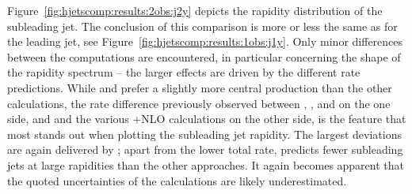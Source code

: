 Figure~\ref{fig:hjetscomp:results:2obs:j2y} depicts the rapidity
distribution of the subleading jet. The conclusion of this comparison is
more or less the same as for the leading jet, see
Figure~\ref{fig:hjetscomp:results:1obs:j1y}. Only minor differences 
between the computations are encountered, in particular concerning the
shape of the rapidity spectrum -- the larger effects are driven by the
different rate predictions. While \Sherpa \NNLOPS and \MGaMC prefer a
slightly more central production than the other calculations, the
 rate difference previously observed between \Powheg \NNLOPS, \MGaMC,
\Herwig and \Sherpa \MEPSatNLO on the one side, and \Sherpa \NNLOPS and
the various \GoSam{}+\Sherpa NLO calculations on the other side, is the
feature that most stands out when plotting the subleading jet rapidity.
The largest deviations are again delivered by \Hej; apart from the
lower total rate, \Hej predicts fewer subleading jets at large
rapidities than the other approaches. It again becomes apparent that
the quoted uncertainties of the \NNLOPS calculations are likely
underestimated.

